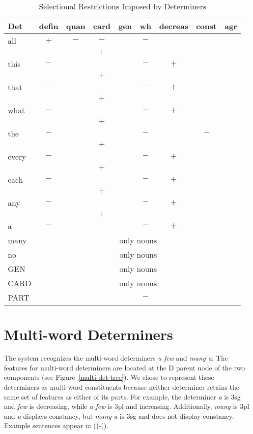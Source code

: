 \begin{table}[hbt]
\vspace*{-2mm}
\centering
\begin{tabular}{|l||c|c|c|c|c|c|c|c|}
\hline
Det&defin&quan&card&gen&wh&decreas&const&agr\\
\hline
\hline
all&$+$&$-$&$-$&&$-$&&&\\
&&&$+$&&&&&\\ \hline
this&$-$&&&&$-$&$+$&&\\
&&&$+$&&&&&\\ \hline
that&$-$&&&&$-$&$+$&&\\
&&&$+$&&&&&\\ \hline
what&$-$&&&&$-$&$+$&&\\
&&&$+$&&&&&\\ \hline
the&$-$&&&&$-$&&$-$&\\ 
&&&$+$&&&&&\\ \hline
every&$-$&&&&$-$&$+$&&\\
&&&$+$&&&&&\\ \hline
each&$-$&&&&$-$&$+$&&\\
&&&$+$&&&&&\\ \hline
any&$-$&&&&$-$&$+$&&\\ 
&&&$+$&&&&&\\ \hline
a&$-$&&&&$-$&$+$&&\\ \hline
many&\multicolumn{8}{c|}{only nouns}\\ \hline
no&\multicolumn{8}{c|}{only nouns}\\ \hline
GEN&\multicolumn{8}{c|}{only nouns}\\ \hline
CARD&\multicolumn{8}{c|}{only nouns}\\ \hline
PART&&&&&$-$&&&\\ \hline
\end{tabular}
\caption{Selectional Restrictions Imposed by Determiners}
\label{det-ordering}
\end{table}


\section{Multi-word Determiners}
The system recognizes the multi-word determiners {\it a few} and {\it many a}.
The features for multi-word determiners are located at the D parent node of 
the two components (see Figure~\ref{multi-det-tree}).  We chose to represent 
these determiners as multi-word constituents because neither determiner 
retains the same set of features as either of its parts.  For example, the 
determiner {\it a} is 3sg and {\it few} is decreasing, while {\it a few} is 
3pl and increasing.  Additionally, {\it many} is 3pl and {\it a} displays 
constancy, but {\it many a} is 3sg and does not display constancy.  Example 
sentences appear in ()-().


